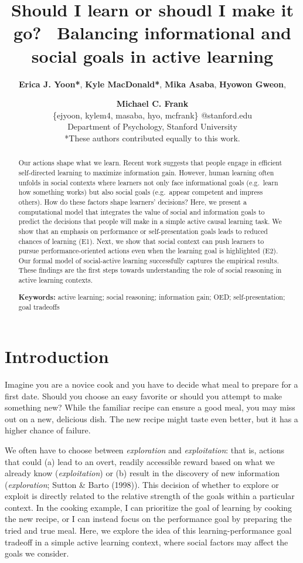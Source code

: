 \documentclass[10pt, letterpaper]{article}
\title{Should I learn or shoudl I make it go? ~Balancing informational and
social goals in active learning}
\author{{\large \bf Erica J. Yoon*}, {\large \bf Kyle MacDonald*}, {\large \bf Mika Asaba}, {\large \bf Hyowon Gweon}, \and {\large \bf Michael C. Frank} \\ \{ejyoon, kylem4, masaba, hyo, mcfrank\} @stanford.edu \\ Department of Psychology, Stanford University \\ *These authors contributed equally to this work.}
\begin{document}
\maketitle

\begin{abstract}
Our actions shape what we learn. Recent work suggests that people engage
in efficient self-directed learning to maximize information gain.
However, human learning often unfolds in social contexts where learners
not only face informational goals (e.g.~learn how something works) but
also social goals (e.g.~appear competent and impress others). How do
these factors shape learners' decisions? Here, we present a
computational model that integrates the value of social and information
goals to predict the decisions that people will make in a simple active
causal learning task. We show that an emphasis on performance or
self-presentation goals leads to reduced chances of learning (E1). Next,
we show that social context can push learners to pursue
performance-oriented actions even when the learning goal is highlighted
(E2). Our formal model of social-active learning successfully captures
the empirical results. These findings are the first steps towards
understanding the role of social reasoning in active learning contexts.

\textbf{Keywords:}
active learning; social reasoning; information gain; OED;
self-presentation; goal tradeoffs
\end{abstract}

\section{Introduction}\label{introduction}

Imagine you are a novice cook and you have to decide what meal to
prepare for a first date. Should you choose an easy favorite or should
you attempt to make something new? While the familiar recipe can ensure
a good meal, you may miss out on a new, delicious dish. The new recipe
might taste even better, but it has a higher chance of failure.

We often have to choose between \emph{exploration} and
\emph{exploitation}: that is, actions that could (a) lead to an overt,
readily accessible reward based on what we already know
(\emph{exploitation}) or (b) result in the discovery of new information
(\emph{exploration}; Sutton \& Barto (1998)). This decision of whether
to explore or exploit is directly related to the relative strength of
the goals within a particular context. In the cooking example, I can
prioritize the goal of learning by cooking the new recipe, or I can
instead focus on the performance goal by preparing the tried and true
meal. Here, we explore the idea of this learning-performance goal
tradeoff in a simple active learning context, where social factors may
affect the goals we consider.
\end{document}
